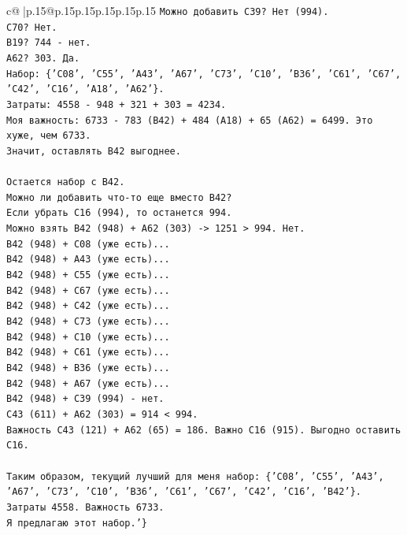 \documentclass{article}
\begin{document}
{\begin{supertabular}{c@{$\;$}|p{.15\linewidth}@{}p{.15\linewidth}p{.15\linewidth}p{.15\linewidth}p{.15\linewidth}p{.15\linewidth}}
{{{\texttt{Можно добавить C39? Нет (994).} \\
\texttt{C70? Нет.} \\
\texttt{B19? 744 {-} нет.} \\
\texttt{A62? 303. Да.} \\
\texttt{Набор: \{'C08', 'C55', 'A43', 'A67', 'C73', 'C10', 'B36', 'C61', 'C67', 'C42', 'C16', 'A18', 'A62'\}.} \\
\texttt{Затраты: 4558 {-} 948 + 321 + 303 = 4234.} \\
\texttt{Моя важность: 6733 {-} 783 (B42) + 484 (A18) + 65 (A62) = 6499. Это хуже, чем 6733.} \\
\texttt{Значит, оставлять B42 выгоднее.} \\
\\ 
\texttt{Остается набор с B42.} \\
\texttt{Можно ли добавить что{-}то еще вместо B42?} \\
\texttt{Если убрать C16 (994), то останется 994.} \\
\texttt{Можно взять B42 (948) + A62 (303) {-}> 1251 > 994. Нет.} \\
\texttt{B42 (948) + C08 (уже есть)...} \\
\texttt{B42 (948) + A43 (уже есть)...} \\
\texttt{B42 (948) + C55 (уже есть)...} \\
\texttt{B42 (948) + C67 (уже есть)...} \\
\texttt{B42 (948) + C42 (уже есть)...} \\
\texttt{B42 (948) + C73 (уже есть)...} \\
\texttt{B42 (948) + C10 (уже есть)...} \\
\texttt{B42 (948) + C61 (уже есть)...} \\
\texttt{B42 (948) + B36 (уже есть)...} \\
\texttt{B42 (948) + A67 (уже есть)...} \\
\texttt{B42 (948) + C39 (994) {-} нет.} \\
\texttt{C43 (611) + A62 (303) = 914 < 994.} \\
\texttt{Важность C43 (121) + A62 (65) = 186. Важно C16 (915). Выгодно оставить C16.} \\
\\ 
\texttt{Таким образом, текущий лучший для меня набор: \{'C08', 'C55', 'A43', 'A67', 'C73', 'C10', 'B36', 'C61', 'C67', 'C42', 'C16', 'B42'\}.} \\
\texttt{Затраты 4558. Важность 6733.} \\
\texttt{Я предлагаю этот набор.'\}} \\
            }
        }
    }
     \\ \\


\end{supertabular}}
\end{document}
